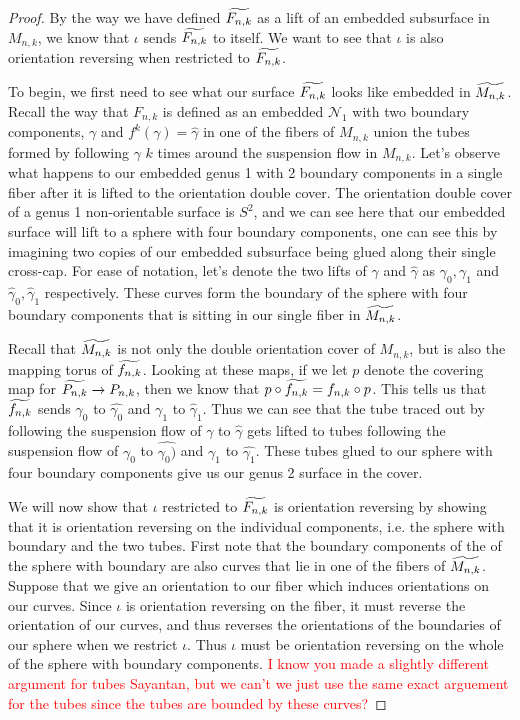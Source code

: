 \begin{proof}

By the way we have defined $\widetilde{F_{n,k}}$ as a lift of an embedded subsurface in $M_{n,k}$, we know that $\iota$ sends $\widetilde{F_{n,k}}$ to itself. We want to see that $\iota$ is also orientation reversing when restricted to $\widetilde{F_{n,k}}$.

To begin, we first need to see what our surface $\widetilde{F_{n,k}}$ looks like embedded in $\widetilde{M_{n,k}}$. Recall the way that $F_{n,k}$ is defined as an embedded $\mathcal{N}_1$ with two boundary components, $\gamma$ and $f^k(\gamma) = \hat{\gamma}$ in one of the fibers of $M_{n,k}$ union the tubes formed by following $\gamma$ $k$ times around the suspension flow in $M_{n,k}$. Let's observe what happens to our embedded genus 1 with 2 boundary components in a single fiber after it is lifted to the orientation double cover. The orientation double cover of a genus 1 non-orientable surface is $S^2$, and we can see here that our embedded surface will lift to a sphere with four boundary components, one can see this by imagining two copies of our embedded subsurface being glued along their single cross-cap. For ease of notation, let's denote the two lifts of $\gamma$ and $\hat{\gamma}$ as $\gamma_0,\gamma_1$ and $\hat{\gamma}_0,\hat{\gamma}_1$ respectively. These curves form the boundary of the sphere with four boundary components that is sitting in our single fiber in $\widetilde{M_{n,k}}$.

Recall that $\widetilde{M_{n,k}}$ is not only the double orientation cover of $M_{n,k}$, but is also the mapping torus of $\widetilde{f_{n,k}}$. Looking at these maps, if we let $p$ denote the covering map for $\widetilde{P_{n,k}} \xrightarrow[]{} P_{n,k}$, then we know that $p \circ \widetilde{f_{n,k}} = f_{n,k} \circ p$. This tells us that $\widetilde{f_{n,k}}$ sends $\gamma_0$ to $\hat{\gamma_0}$ and $\gamma_1$ to $\hat{\gamma}_1$. Thus we can see that the tube traced out by following the suspension flow of $\gamma$ to $\hat{\gamma}$ gets lifted to tubes following the suspension flow of $\gamma_0$ to $\hat{\gamma_0)}$ and $\gamma_1$ to $\hat{\gamma_1}$. These tubes glued to our sphere with four boundary components give us our genus 2 surface in the cover.

We will now show that $\iota$ restricted to $\widetilde{F_{n,k}}$ is orientation reversing by showing that it is orientation reversing on the individual components, i.e. the sphere with boundary and the two tubes. First note that the boundary components of the of the sphere with boundary are also curves that lie in one of the fibers of $\widetilde{M_{n,k}}$. Suppose that we give an orientation to our fiber which induces orientations on our curves. Since $\iota$ is orientation reversing on the fiber, it must reverse the orientation of our curves, and thus reverses the orientations of the boundaries of our sphere when we restrict $\iota$. Thus $\iota$ must be orientation reversing on the whole of the sphere with boundary components. \textcolor{red}{I know you made a slightly different argument for tubes Sayantan, but we can't we just use the same exact arguement for the tubes since the tubes are bounded by these curves?}


\end{proof}
